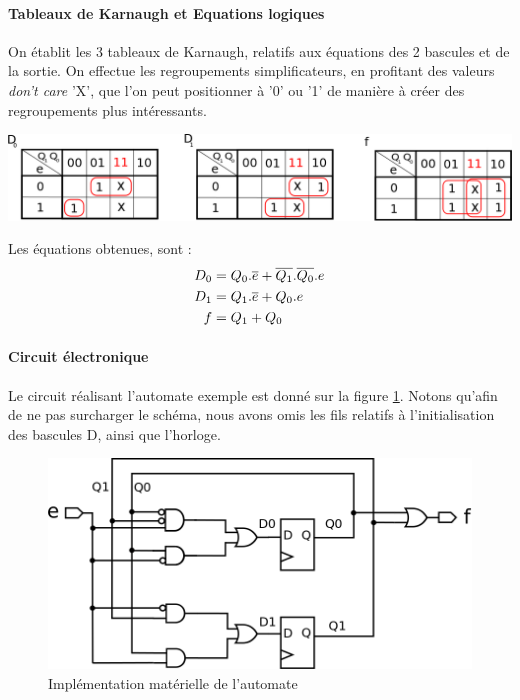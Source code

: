 \paragraph{Tableaux de Karnaugh et Equations logiques}
On établit les 3 tableaux de Karnaugh, relatifs aux équations des 2 bascules et de la sortie. On effectue les regroupements simplificateurs, en profitant
des valeurs {\it don't care} 'X', que l'on peut positionner à '0' ou '1' de manière à créer des regroupements plus intéressants.
\begin{center}
\includegraphics[scale=0.4]{./figures/exemple_table_k.png}
\end{center}


Les équations obtenues, sont :
\begin{align}
 D_0 & = Q_0.\overline{e}+\overline{Q_1}.\overline{Q_0}.e \\
 D_1 & = Q_1.\overline{e}+Q_0.e \\
 f   & = Q_1 + Q_0 \\
\end{align}

\paragraph{Circuit électronique}
Le circuit réalisant l'automate exemple est donné sur la figure \ref{fig:circuit}. Notons qu'afin de ne pas surcharger le schéma, nous avons omis les fils
relatifs à l'initialisation des bascules D, ainsi que l'horloge.
\begin{figure}[h]
  \centering
  \includegraphics[scale=0.35]{./figures/fsm_circuit.png}
  \caption{Implémentation matérielle de l'automate}
  \label{fig:circuit}
\end{figure}



